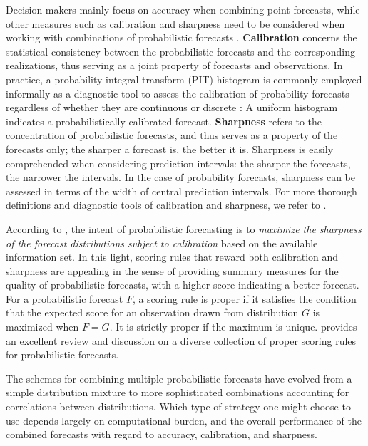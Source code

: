 \documentclass[a4paper,11pt]{article}
\begin{document}
Decision makers mainly focus on accuracy when combining point forecasts, while other measures such as calibration and sharpness need to be considered when working with combinations of probabilistic forecasts \citep{Gneiting2007-fr,Gneiting2007-ij,Lahiri2015-qq}. \textbf{Calibration} concerns the statistical consistency between the probabilistic forecasts and the corresponding realizations, thus serving as a joint property of forecasts and observations. In practice, a probability integral transform (PIT) histogram is commonly employed informally as a diagnostic tool to assess the calibration of probability forecasts regardless of whether they are continuous \citep{Dawid1984-vp,Diebold1998-cr} or discrete \citep{Gneiting2013-hl}: A uniform histogram indicates a probabilistically calibrated forecast. \textbf{Sharpness} refers to the concentration of probabilistic forecasts, and thus serves as a property of the forecasts only; the sharper a forecast is, the better it is. Sharpness is easily comprehended when considering prediction intervals: the sharper the forecasts, the narrower the intervals. In the case of probability forecasts, sharpness can be assessed in terms of the width of central prediction intervals. For more thorough definitions and diagnostic tools of calibration and sharpness, we refer to \citet{Gneiting2014-tz}.

According to \citet{Gneiting2007-fr}, the intent of probabilistic forecasting is to \textit{maximize the sharpness of the forecast distributions subject to calibration} based on the available information set. In this light, scoring rules that reward both calibration and sharpness are appealing in the sense of providing summary measures for the quality of probabilistic forecasts, with a higher score indicating a better forecast. For a probabilistic forecast $F$, a scoring rule is proper if it satisfies the condition that the expected score for an observation drawn from distribution $G$ is maximized when $F=G$. It is strictly proper if the maximum is unique. \citet{Gneiting2007-ij} provides an excellent review and discussion on a diverse collection of proper scoring rules for probabilistic forecasts.

The schemes for combining multiple probabilistic forecasts have evolved from a simple distribution mixture to more sophisticated combinations accounting for correlations between distributions. Which type of strategy one might choose to use depends largely on computational burden, and the overall performance of the combined forecasts with regard to accuracy, calibration, and sharpness.
\end{document}
